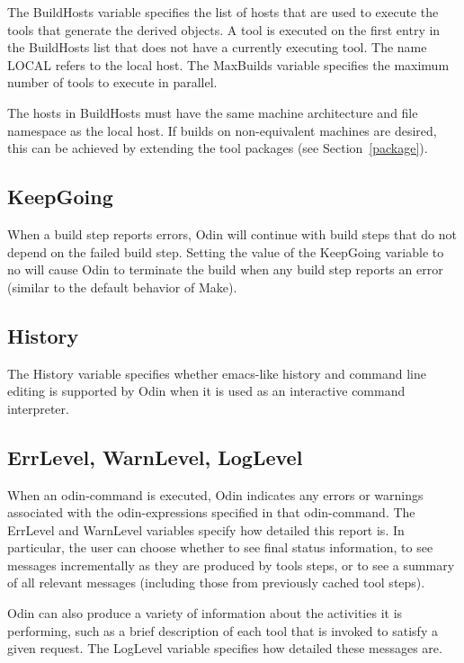 The {\ex BuildHosts} variable specifies the list of hosts that are used to
execute the tools that generate the derived objects.
A tool is executed on the first entry in the {\ex BuildHosts}
list that does not have a currently executing tool.
The name {\ex LOCAL} refers to the local host.
The {\ex MaxBuilds} variable specifies the maximum number of tools
to execute in parallel.

The hosts in {\ex BuildHosts} must have
the same machine architecture and file namespace as the local host.
If builds on non-equivalent machines are desired,
this can be achieved by extending the tool packages
(see Section~\ref{package}).

\subsection{KeepGoing}
\label{keepgoing}

When a build step reports errors, Odin will continue with build
steps that do not depend on the failed build step.
Setting the value of the {\ex KeepGoing} variable to {\ex no}
will cause Odin to terminate the build when any build step
reports an error (similar to the default behavior of Make).

\subsection{History}
\label{history}

The {\ex History} variable specifies whether emacs-like 
history and command line editing is supported by Odin
when it is used as an interactive command interpreter.

\subsection{ErrLevel, WarnLevel, LogLevel}
\label{errlevel}

When an odin-command is executed, Odin indicates any errors or
warnings associated with the odin-expressions specified in that odin-command.
The {\ex ErrLevel} and {\ex WarnLevel} variables specify
how detailed this report is.
In particular, the user can choose whether
to see final status information,
to see messages incrementally as they are produced by tools steps,
or to see a summary of all relevant messages (including those from
previously cached tool steps).

Odin can also produce a variety of information about the activities
it is performing, such as a brief description of each tool that is
invoked to satisfy a given request.
The {\ex LogLevel} variable specifies how detailed these messages are.

